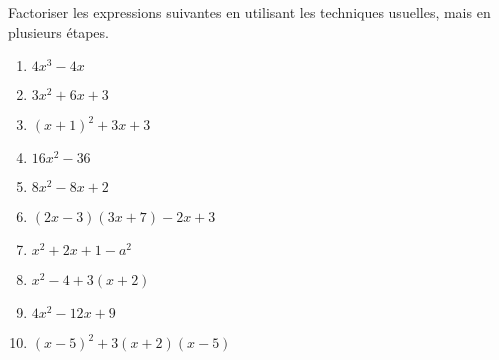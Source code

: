 
\begin{exercice}\label{exosmath-0048}

    Factoriser les expressions suivantes en utilisant les techniques usuelles, mais en plusieurs étapes.
    \begin{multicols}{3}
        \begin{enumerate}
            \item
                \( 4x^3-4x\)
            \item
                \( 3x^2+6x+3\)
            \item
                \( (x+1)^2+3x+3\)
            \item
                \( 16x^2-36\)
            \item
                \( 8x^2-8x+2\)
            \item
                \( (2x-3)(3x+7)-2x+3\)
            \item
                \( x^2+2x+1-a^2\)
            \item
                \( x^2-4+3(x+2)\)
            \item
                \( 4x^2-12x+9\)
            \item
                \( (x-5)^2+3(x+2)(x-5)\)
        \end{enumerate}
    \end{multicols}

\end{exercice}
